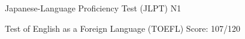 



\begin{cvhonors}

  \cvhonor
    {Japanese-Language Proficiency Test (JLPT)} %
    {N1} %
    {} %
    {} %

  \cvhonor
    {Test of English as a Foreign Language (TOEFL)} %
    {Score: 107/120} %
    {} %
    {} %

\end{cvhonors}

